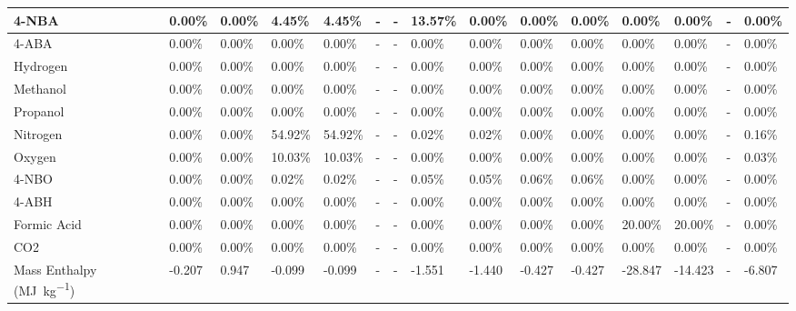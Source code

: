 \begin{landscape}
\begin{table}[H]
\begin{tabular}{|l|l|l|l|l|l|l|l|l|l|l|l|l|l|l|}
4-NBA                   & 0.00\%   & 0.00\%   & 4.45\%  & 4.45\%  & -    & -    & 13.57\% & 0.00\%  & 0.00\%  & 0.00\%  & 0.00\%  & 0.00\%  & -    & 0.00\%  \\ \hline
4-ABA                   & 0.00\%   & 0.00\%   & 0.00\%  & 0.00\%  & -    & -    & 0.00\%  & 0.00\%  & 0.00\%  & 0.00\%  & 0.00\%  & 0.00\%  & -    & 0.00\%  \\ \hline
Hydrogen                & 0.00\%   & 0.00\%   & 0.00\%  & 0.00\%  & -    & -    & 0.00\%  & 0.00\%  & 0.00\%  & 0.00\%  & 0.00\%  & 0.00\%  & -    & 0.00\%  \\ \hline
Methanol                & 0.00\%   & 0.00\%   & 0.00\%  & 0.00\%  & -    & -    & 0.00\%  & 0.00\%  & 0.00\%  & 0.00\%  & 0.00\%  & 0.00\%  & -    & 0.00\%  \\ \hline
Propanol                & 0.00\%   & 0.00\%   & 0.00\%  & 0.00\%  & -    & -    & 0.00\%  & 0.00\%  & 0.00\%  & 0.00\%  & 0.00\%  & 0.00\%  & -    & 0.00\%  \\ \hline
Nitrogen                & 0.00\%   & 0.00\%   & 54.92\% & 54.92\% & -    & -    & 0.02\%  & 0.02\%  & 0.00\%  & 0.00\%  & 0.00\%  & 0.00\%  & -    & 0.16\%  \\ \hline
Oxygen                  & 0.00\%   & 0.00\%   & 10.03\% & 10.03\% & -    & -    & 0.00\%  & 0.00\%  & 0.00\%  & 0.00\%  & 0.00\%  & 0.00\%  & -    & 0.03\%  \\ \hline
4-NBO                   & 0.00\%   & 0.00\%   & 0.02\%  & 0.02\%  & -    & -    & 0.05\%  & 0.05\%  & 0.06\%  & 0.06\%  & 0.00\%  & 0.00\%  & -    & 0.00\%  \\ \hline
4-ABH                   & 0.00\%   & 0.00\%   & 0.00\%  & 0.00\%  & -    & -    & 0.00\%  & 0.00\%  & 0.00\%  & 0.00\%  & 0.00\%  & 0.00\%  & -    & 0.00\%  \\ \hline
Formic Acid             & 0.00\%   & 0.00\%   & 0.00\%  & 0.00\%  & -    & -    & 0.00\%  & 0.00\%  & 0.00\%  & 0.00\%  & 20.00\% & 20.00\% & -    & 0.00\%  \\ \hline
CO2                     & 0.00\%   & 0.00\%   & 0.00\%  & 0.00\%  & -    & -    & 0.00\%  & 0.00\%  & 0.00\%  & 0.00\%  & 0.00\%  & 0.00\%  & -    & 0.00\%  \\ \hline
Mass Enthalpy (\si{\mega\J\per\kg})    & -0.207   & 0.947    & -0.099  & -0.099  & -    & -    & -1.551  & -1.440  & -0.427  & -0.427  & -28.847 & -14.423 & -    & -6.807  \\ \hline
\end{tabular}
\end{table}




\end{landscape}

